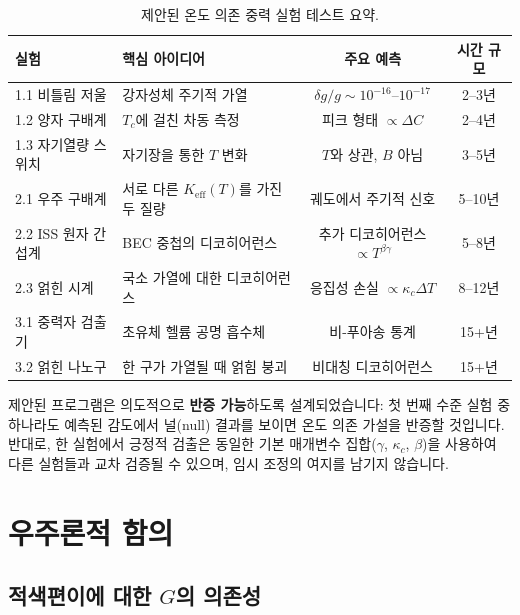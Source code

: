 \documentclass[11pt,a4paper]{article}
\newcommand{\Keff}{K_{\mathrm{eff}}}
\begin{document}
	\begin{table}[htbp]
		\centering
		\caption{제안된 온도 의존 중력 실험 테스트 요약.}
		\label{tab:experiment-summary}
		\small
		\begin{tabularx}{\textwidth}{l X c c}
			\toprule
			\textbf{실험} & \textbf{핵심 아이디어} & \textbf{주요 예측} & \textbf{시간 규모} \\
			\midrule
			1.1 비틀림 저울 & 강자성체 주기적 가열 & \(\delta g/g \sim 10^{-16}\)–\(10^{-17}\) & 2–3년 \\
			1.2 양자 구배계 & \(T_c\)에 걸친 차동 측정 & 피크 형태 \(\propto \Delta C\) & 2–4년 \\
			1.3 자기열량 스위치 & 자기장을 통한 \(T\) 변화 & \(T\)와 상관, \(B\) 아님 & 3–5년 \\
			2.1 우주 구배계 & 서로 다른 \(\Keff(T)\)를 가진 두 질량 & 궤도에서 주기적 신호 & 5–10년 \\
			2.2 ISS 원자 간섭계 & BEC 중첩의 디코히어런스 & 추가 디코히어런스 \(\propto T^{\beta\gamma}\) & 5–8년 \\
			2.3 얽힌 시계 & 국소 가열에 대한 디코히어런스 & 응집성 손실 \(\propto \kappa_c \Delta T\) & 8–12년 \\
			3.1 중력자 검출기 & 초유체 헬륨 공명 흡수체 & 비-푸아송 통계 & 15+년 \\
			3.2 얽힌 나노구 & 한 구가 가열될 때 얽힘 붕괴 & 비대칭 디코히어런스 & 15+년 \\
			\bottomrule
		\end{tabularx}
	\end{table}
	
	제안된 프로그램은 의도적으로 \textbf{반증 가능}하도록 설계되었습니다: 첫 번째 수준 실험 중 하나라도 예측된 감도에서 널(null) 결과를 보이면 온도 의존 가설을 반증할 것입니다. 반대로, 한 실험에서 긍정적 검출은 동일한 기본 매개변수 집합($\gamma$, $\kappa_c$, $\beta$)을 사용하여 다른 실험들과 교차 검증될 수 있으며, 임시 조정의 여지를 남기지 않습니다.
	
	
	\section{우주론적 함의}
	\label{sec:cosmo}
	
	\subsection{적색편이에 대한 $G$의 의존성}
	\label{subsec:cosmo-gz}
	
\end{document}
